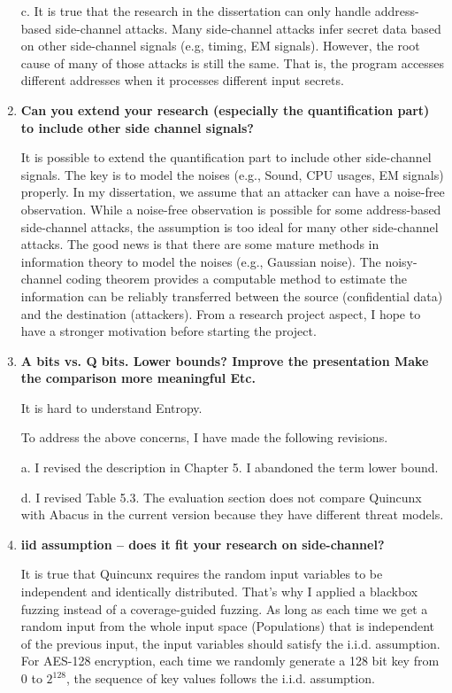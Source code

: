 \documentclass{article}
\begin{document}
\begin{enumerate}
c. It is true that the research in the dissertation can only handle address-based side-channel attacks. Many side-channel attacks infer secret data based on other side-channel signals (e.g, timing, EM signals). However, the root cause of many of those attacks is still the same. That is, the program accesses different addresses when it processes different input secrets.

\item \textbf{Can you extend your research (especially the quantification part) to include other side channel signals?}

It is possible to extend the quantification part to include other side-channel signals. The key is to model the noises (e.g., Sound, CPU usages, EM signals) properly. In my dissertation, we assume that an attacker can have a noise-free observation. While a noise-free observation is possible for some address-based side-channel attacks, the assumption is too ideal for many other side-channel attacks. The good news is that there are some mature methods in information theory to model the noises (e.g., Gaussian noise). The noisy-channel coding theorem provides a computable method to estimate the information can be reliably transferred between the source (confidential data) and the destination (attackers). From a research project aspect, I hope to have a stronger motivation before starting the project. 
\item \textbf{A bits vs. Q bits. Lower bounds?
       Improve the presentation
       Make the comparison more meaningful
       Etc.}
       
It is hard to understand Entropy. 
       
       
To address the above concerns, I have made the following revisions.

a. I revised the description in Chapter 5. I abandoned the term lower bound.

d. I revised Table 5.3. The evaluation section does not compare Quincunx with Abacus in the current version because they have different threat models.
\item \textbf{iid assumption – does it fit your research on side-channel?}

It is true that Quincunx requires the random input variables to be independent and identically distributed. That's why I applied a blackbox fuzzing instead of a coverage-guided fuzzing. As long as each time we get a random input from the whole input space (Populations) that is independent of the previous input, the input variables should satisfy the i.i.d. assumption. For AES-128 encryption, each time we randomly generate a 128 bit key from $0$ to $2^{128}$, the sequence of key values follows the i.i.d. assumption.


\end{enumerate}
\end{document}
